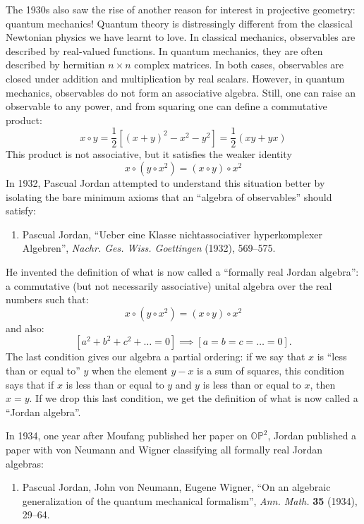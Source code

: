 \documentclass{article}
\def\tightlist{}
\begin{document}
The 1930s also saw the rise of another reason for interest in projective
geometry: quantum mechanics! Quantum theory is distressingly different
from the classical Newtonian physics we have learnt to love. In
classical mechanics, observables are described by real-valued functions.
In quantum mechanics, they are often described by hermitian
\(n\times n\) complex matrices. In both cases, observables are closed
under addition and multiplication by real scalars. However, in quantum
mechanics, observables do not form an associative algebra. Still, one
can raise an observable to any power, and from squaring one can define a
commutative product:
\[x \circ y = \frac12[(x+y)^2 - x^2 - y^2] = \frac12(xy + yx)\] This
product is not associative, but it satisfies the weaker identity
\[x\circ (y\circ x^2) = (x\circ y)\circ x^2\] In 1932, Pascual Jordan
attempted to understand this situation better by isolating the bare
minimum axioms that an ``algebra of observables'' should satisfy:

\begin{enumerate}
\def\labelenumi{\arabic{enumi})}
\setcounter{enumi}{5}
\tightlist
\item
  Pascual Jordan, ``Ueber eine Klasse nichtassociativer hyperkomplexer
  Algebren'', \emph{Nachr. Ges. Wiss. Goettingen} (1932), 569--575.
\end{enumerate}

He invented the definition of what is now called a ``formally real
Jordan algebra'': a commutative (but not necessarily associative) unital
algebra over the real numbers such that:
\[x\circ (y\circ x^2) = (x\circ y)\circ x^2\] and also:
\[[a^2 + b^2 + c^2 + \ldots = 0] \implies [a = b = c = \ldots = 0].\]
The last condition gives our algebra a partial ordering: if we say that
\(x\) is ``less than or equal to'' \(y\) when the element \(y-x\) is a
sum of squares, this condition says that if \(x\) is less than or equal
to \(y\) and \(y\) is less than or equal to \(x\), then \(x = y\). If we
drop this last condition, we get the definition of what is now called a
``Jordan algebra''.

In 1934, one year after Moufang published her paper on
\(\mathbb{OP}^2\), Jordan published a paper with von Neumann and Wigner
classifying all formally real Jordan algebras:

\begin{enumerate}
\def\labelenumi{\arabic{enumi})}
\setcounter{enumi}{6}
\tightlist
\item
  Pascual Jordan, John von Neumann, Eugene Wigner, ``On an algebraic
  generalization of the quantum mechanical formalism'', \emph{Ann.
  Math.} \textbf{35} (1934), 29--64.
\end{enumerate}
\end{document}
